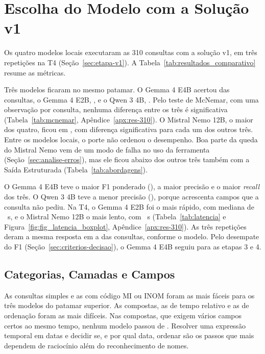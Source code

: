 \section{Escolha do Modelo com a Solução v1}
\label{sec:comparativo}
\label{sec:estatistica}

Os quatro modelos locais executaram as 310 consultas com a solução v1, em três repetições na T4 (Seção~\ref{sec:etapa-v1}). A Tabela~\ref{tab:resultados_comparativo} resume as métricas.


Três modelos ficaram no mesmo patamar. O Gemma 4 E4B acertou  das consultas, o Gemma 4 E2B, , e o Qwen 3 4B, . Pelo teste de McNemar, com uma observação por consulta, nenhuma diferença entre os três é significativa (Tabela~\ref{tab:mcnemar}, Apêndice~\ref{apx:res-310}). O Mistral Nemo 12B, o maior dos quatro, ficou em , com diferença significativa para cada um dos outros três. Entre os modelos locais, o porte não ordenou o desempenho. Boa parte da queda do Mistral Nemo vem de um modo de falha no uso da ferramenta (Seção~\ref{sec:analise-erros}), mas ele ficou abaixo dos outros três também com a Saída Estruturada (Tabela~\ref{tab:abordagens}).

O Gemma 4 E4B teve o maior F1 ponderado (), a maior precisão e o maior \textit{recall} dos três. O Qwen 3 4B teve a menor precisão (), porque acrescenta campos que a consulta não pediu. Na T4, o Gemma 4 E2B foi o mais rápido, com mediana de ~s, e o Mistral Nemo 12B o mais lento, com ~s (Tabela~\ref{tab:latencia} e Figura~\ref{fig:fig_latencia_boxplot}, Apêndice~\ref{apx:res-310}). As três repetições deram a mesma resposta em  a  das  consultas, conforme o modelo. Pelo desempate do F1 (Seção~\ref{sec:criterios-decisao}), o Gemma 4 E4B seguiu para as etapas 3 e 4.

\subsection{Categorias, Camadas e Campos}
\label{sec:por-categoria}
\label{sec:por-campo}

As consultas simples e as com código MI ou INOM foram as mais fáceis para os três modelos do patamar superior. As compostas, as de tempo relativo e as de ordenação foram as mais difíceis. Nas compostas, que exigem vários campos certos ao mesmo tempo, nenhum modelo passou de . Resolver uma expressão temporal em datas e decidir se, e por qual data, ordenar são os passos que mais dependem de raciocínio além do reconhecimento de nomes.

